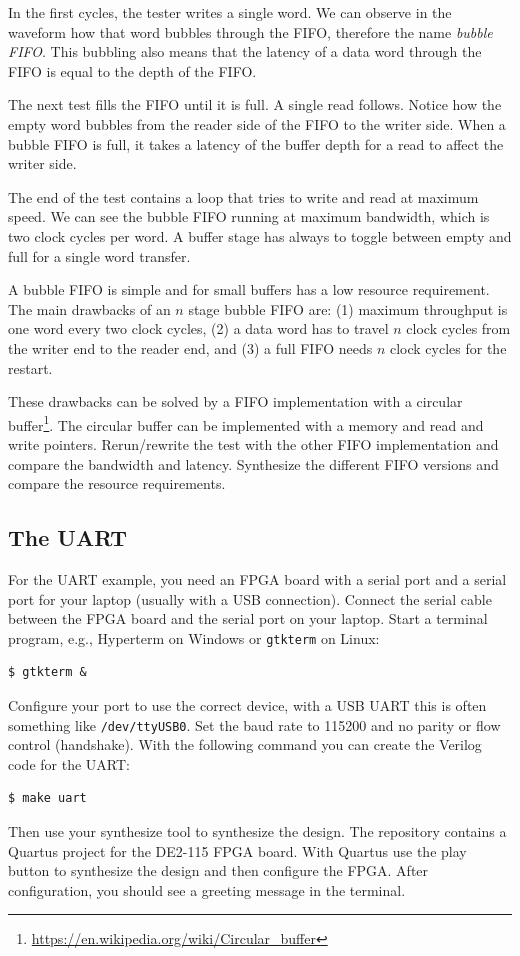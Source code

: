 \documentclass[%
    10pt,
    headinclude, footexclude,
    openright, %
    notitlepage,
    cleardoubleempty,
    headsepline,
    pointlessnumbers,
    bibtotoc, idxtotoc,
    ]{scrbook}
\newcommand{\code}[1]{{\small{\texttt{#1}}}}
\newcommand{\myref}[2]{\href{#1}{#2}}
\renewcommand{\myref}[2]{{#2}{\footnote{\url{#1}}}}
\begin{document}
In the first cycles, the tester writes a single word. We can observe in
the waveform how that word bubbles through the FIFO, therefore the
name \emph{bubble FIFO}. This bubbling also means that the
latency of a data word through the FIFO is equal to the depth of the FIFO.

The next test fills the FIFO until it is full. A single read follows.
Notice how the empty word bubbles from the reader side of the FIFO
to the writer side. When a bubble FIFO is full, it takes
a latency of the buffer depth for a read to affect the writer side.

The end of the test contains a loop that tries to write and read at maximum speed.
We can see the bubble FIFO running at maximum bandwidth, which is two
clock cycles per word. A buffer stage has always to toggle between empty
and full for a single word transfer.

A bubble FIFO is simple and for small buffers has a low resource requirement.
The main drawbacks of an $n$ stage bubble FIFO are: (1) maximum throughput is
one word every two clock cycles, (2) a data word has to travel $n$ clock cycles
from the writer end to the reader end, and (3) a full FIFO needs $n$ clock cycles
for the restart.

These drawbacks can be solved by a FIFO implementation with a
\myref{https://en.wikipedia.org/wiki/Circular_buffer}{circular buffer}.
The circular buffer can be implemented with a memory and
read and write pointers.
Rerun/rewrite the test with the other FIFO implementation and compare
the bandwidth and latency. Synthesize the different FIFO versions and compare
the resource requirements.

\subsection{The UART}

For the UART example, you need an FPGA board with a serial port and
a serial port for your laptop (usually with a USB connection).
Connect the serial cable between the FPGA board and the serial port on
your laptop. Start a terminal program, e.g., Hyperterm on Windows
or \code{gtkterm} on Linux:
\begin{verbatim}
$ gtkterm &
\end{verbatim}
Configure your port to use the correct device, with a USB UART this
is often something like \code{/dev/ttyUSB0}. Set the baud rate to 115200
and no parity or flow control (handshake).
With the following command you can create the Verilog code for the UART:
\begin{verbatim}
$ make uart
\end{verbatim}
Then use your synthesize tool to synthesize the design.
The repository contains a Quartus project for the DE2-115 FPGA board.
With Quartus use the play button to synthesize the design and then configure
the FPGA.
After configuration, you should see a greeting message in the terminal.
\end{document}
